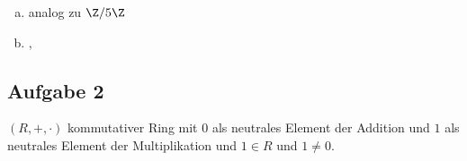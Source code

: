 \begin{itemize}
\begin{enumerate}[a)]
\begin{tabular}{c|cccccc}
    \end{tabular}

    \item analog zu $\Z / 5\Z$

    \item {}, 

    \end{enumerate}


\end{itemize}

\subsection*{Aufgabe 2}
$(R, +, \cdot)$ kommutativer Ring mit $0$ als neutrales Element der Addition und $1$ als neutrales Element der Multiplikation und $1 \in R$ und $1 \neq 0$.

